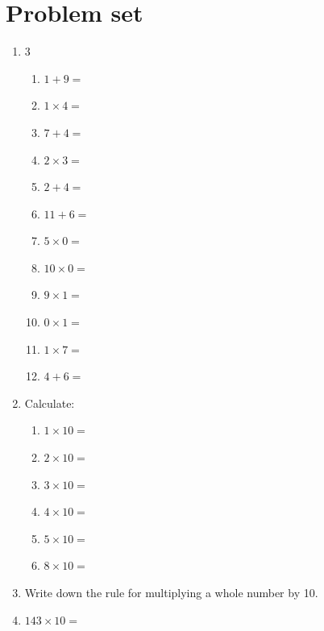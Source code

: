 \documentclass{tufte-book}
\begin{document}
\clearpage\section{Problem set }
\begin{enumerate}
  \item
  \begin{multicols}{3}
    \begin{enumerate}\bigskip
      \item $1 + 9 =$ \dotfill\bigskip
      \item $1 \times 4 =$ \dotfill\bigskip
      \item $7 + 4 =$ \dotfill\bigskip
      \item $2 \times 3 =$ \dotfill
      \item $2 + 4 =$ \dotfill\bigskip
      \item $11 + 6 =$ \dotfill\bigskip
      \item $5 \times 0 =$ \dotfill\bigskip
      \item $10 \times 0 =$ \dotfill
      \item $9 \times 1 =$ \dotfill\bigskip
      \item $0 \times 1 =$ \dotfill\bigskip
      \item $1 \times 7 =$ \dotfill\bigskip
      \item $4 + 6 =$ \dotfill
    \end{enumerate}
  \end{multicols}

  \item Calculate:
  \begin{enumerate}\bigskip
    \item $1 \times 10 = $\dotfill\bigskip
    \item $2 \times 10 = $\dotfill\bigskip
    \item $3 \times 10 = $\dotfill\bigskip
    \item $4 \times 10 = $\dotfill\bigskip
    \item $5 \times 10 = $\dotfill\bigskip
    \item $8 \times 10 = $\dotfill\bigskip
  \end{enumerate}

  \item Write down the rule for multiplying a whole number by 10.
  \bigskip\par\dotfill\bigskip\par\dotfill\bigskip

  \item $143 \times 10 =$ \dotfill\bigskip
\end{enumerate}
\end{document}
